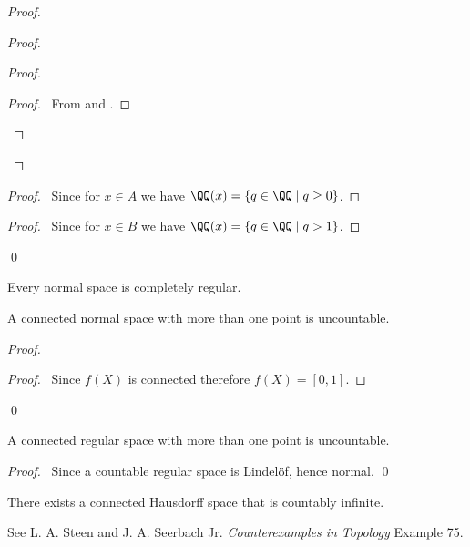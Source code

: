 \begin{proof}
\begin{proof}
\begin{proof}
\begin{proof}
                \pf\ From  and .
            \end{proof}
        \end{proof}
    \end{proof}
    \begin{proof}
        \pf\ Since for $x \in A$ we have $\QQ(x) = \{ q \in \QQ \mid q \geq 0 \}$.
    \end{proof}
    \begin{proof}
        \pf\ Since for $x \in B$ we have $\QQ(x) = \{ q \in \QQ \mid q > 1 \}$.
    \end{proof}
    \qed
\end{proof}

\begin{corollary}
    Every normal space is completely regular.
\end{corollary}

\begin{proposition}
    A connected normal space with more than one point is uncountable.
\end{proposition}

\begin{proof}
    \pf
    \begin{proof}
        \pf\ Since $f(X)$ is connected therefore $f(X) = [0,1]$.
    \end{proof}
    \qed
\end{proof}

\begin{corollary}
    A connected regular space with more than one point is uncountable.
\end{corollary}

\begin{proof}
    \pf\ Since a countable regular space is Lindel\"{o}f, hence normal. \qed
\end{proof}

\begin{example}
    There exists a connected Hausdorff space that is countably infinite.

    See L. A. Steen and J. A. Seerbach Jr. \emph{Counterexamples in
    Topology} Example 75.
\end{example}

